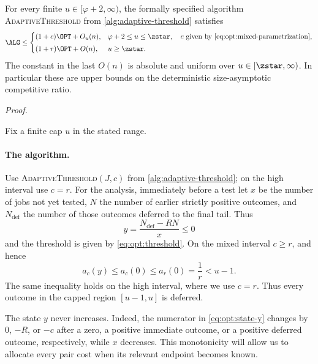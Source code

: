 \begin{theorem}
\label{thm:opt:optional-middle-upper}
For every finite $u\in[\varphi+2,\infty)$, the formally specified algorithm
\textnormal{\textsc{AdaptiveThreshold}} from
\cref{alg:adaptive-threshold}
satisfies
\[
 \ALG\le
 \begin{cases}
  (1+c)\OPT+O_u(n),
     & \varphi+2\le u\le \zstar,
       \quad c\text{ given by \eqref{eq:opt:mixed-parametrization}},\\[1mm]
  (1+r)\OPT+O(n),
     & u\ge \zstar.
 \end{cases}
\]
The constant in the last $O(n)$ is absolute and uniform over
$u\in[\zstar,\infty)$.
In particular these are upper bounds on the deterministic
size-asymptotic competitive ratio.
\end{theorem}

\noindent\emph{Proof.}

Fix a finite cap $u$ in the stated range.

\paragraph{The algorithm.}
Use \textsc{AdaptiveThreshold}$(J,c)$ from
\cref{alg:adaptive-threshold}; on the high interval use $c=r$.
For the analysis, immediately before a test let $x$ be the number of jobs not
yet tested, $N$ the number of earlier strictly positive outcomes, and $N_{\mathrm{def}}$ the
number of those outcomes deferred to the final tail.  Thus
\begin{equation}
 y=\frac{N_{\mathrm{def}}-RN}{x}\le0
 \label{eq:opt:state-y}
\end{equation}
and the threshold is given by \cref{eq:opt:threshold}.  On the mixed interval
$c\ge r$, and hence
\[
 a_c(y)\le a_c(0)\le a_r(0)=\frac1r<u-1.
 \label{eq:opt:threshold-below-cap}
\]
The same inequality holds on the high interval, where we use $c=r$.
Thus every outcome in the capped region $[u-1,u]$ is deferred.

The state $y$ never increases.  Indeed, the numerator in
\eqref{eq:opt:state-y} changes by $0$, $-R$, or $-c$ after a zero, a
positive immediate outcome, or a positive deferred outcome, respectively,
while $x$ decreases.  This monotonicity will allow us to allocate every
pair cost when its relevant endpoint becomes known.

